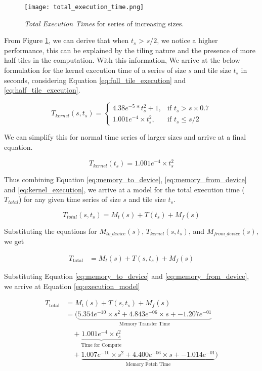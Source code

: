 \begin{figure}[h!]
    \texttt{[image: total\_execution\_time.png]}
    \centering
    \caption{\textit{Total Execution Times} for series of increasing sizes.}
    \label{fig:total_execution_time}
\end{figure}

From Figure \ref{fig:total_execution_time}, we can derive that when $t_s$ > $s / 2$, we notice a higher performance, this can be explained by the tiling nature and the presence of more half tiles in the computation. With this information, We arrive at the below formulation for the kernel execution time of a series of size $s$ and tile size $t_s$ in seconds, considering Equation \ref{eq:full_tile_execution} and \ref{eq:half_tile_execution}.

\begin{equation}
    T_{kernel}(s, t_s)= 
    \begin{cases}
        4.38e^{-5} * t_s^2 + 1,& \text{if } t_s > s \times 0.7\\
        1.001e^{-4} \times t_s^2,& \text{if } t_s \leq s / 2 
    \end{cases}
    \label{eq:kernel_execution}
\end{equation}

We can simplify this for normal time series of larger sizes and arrive at a final equation.

\begin{equation}
    T_{kernel}(t_s)= 1.001e^{-4} \times t_s^2
\end{equation}

Thus combining Equation \ref{eq:memory_to_device}, \ref{eq:memory_from_device} and \ref{eq:kernel_execution}, we arrive at a model for the total execution time ($T_{total}$) for any given time series of size $s$ and tile size $t_s$.

\[ T_{total}(s, t_s) =  M_t(s) + T(t_s) + M_f(s) \]

Substituting the equations for \( M_{to\_device}(s) \), \( T_{kernel}(s, t_s) \), and \( M_{from\_device}(s) \), we get

\[
    \begin{aligned}
        T_{\text{total}} &= M_t(s) + T(s, t_s) + M_f(s)
    \end{aligned}
\]

Substituting Equation \ref{eq:memory_to_device} and \ref{eq:memory_from_device}, we arrive at Equation \ref{eq:execution_model}

\begin{equation}
    \begin{aligned}
        T_{\text{total}} &= M_t(s) + T(s, t_s) + M_f(s) \\
        &= (\underbrace{5.354e^{-10} \times s^2 + 4.843e^{-06} \times s + -1.207e^{-01}}_{\text{Memory Transfer Time}} \\
        &\quad + \underbrace{1.001e^{-4} \times t_s^2}_{\text{Time for Compute}} \\
        &\quad + \underbrace{1.007e^{-10} \times s^2 + 4.400e^{-06} \times s + -1.014e^{-01}}_{\text{Memory Fetch Time}})
    \end{aligned}
    \label{eq:execution_model}
\end{equation}

